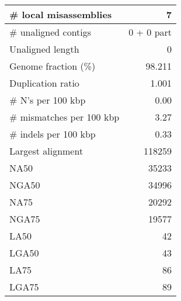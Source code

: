 \documentclass[12pt,a4paper]{article}
\begin{document}
\begin{table}[ht]
\begin{center}
\begin{tabular}{|l*{1}{|r}|}
\# local misassemblies & 7 \\ \hline
\# unaligned contigs & 0 + 0 part \\ \hline
Unaligned length & 0 \\ \hline
Genome fraction (\%) & 98.211 \\ \hline
Duplication ratio & 1.001 \\ \hline
\# N's per 100 kbp & 0.00 \\ \hline
\# mismatches per 100 kbp & 3.27 \\ \hline
\# indels per 100 kbp & 0.33 \\ \hline
Largest alignment & 118259 \\ \hline
NA50 & 35233 \\ \hline
NGA50 & 34996 \\ \hline
NA75 & 20292 \\ \hline
NGA75 & 19577 \\ \hline
LA50 & 42 \\ \hline
LGA50 & 43 \\ \hline
LA75 & 86 \\ \hline
LGA75 & 89 \\ \hline
\end{tabular}
\end{center}
\end{table}
\end{document}
